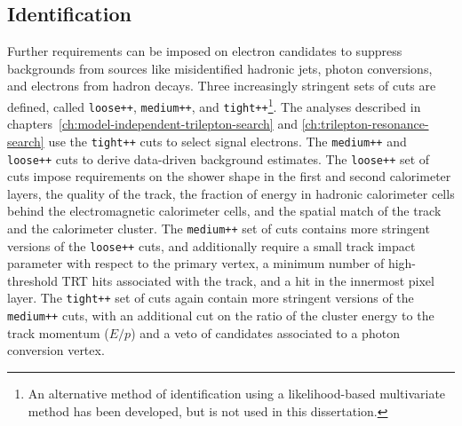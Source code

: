 \subsection{Identification}\label{sec:reco-electron-identification}
Further requirements can be imposed on electron candidates to suppress backgrounds from sources like misidentified hadronic jets, photon conversions, and electrons from hadron decays. Three increasingly stringent sets of cuts are defined, called \texttt{loose++}, \texttt{medium++}, and \texttt{tight++}\footnote{An alternative method of identification using a likelihood-based multivariate method has been developed, but is not used in this dissertation.}. The analyses described in chapters~\ref{ch:model-independent-trilepton-search} and \ref{ch:trilepton-resonance-search} use the \texttt{tight++} cuts to select signal electrons. The \texttt{medium++} and \texttt{loose++} cuts to derive data-driven background estimates. The \texttt{loose++} set of cuts impose requirements on the shower shape in the first and second calorimeter layers, the quality of the track, the fraction of energy in hadronic calorimeter cells behind the electromagnetic calorimeter cells, and the spatial match of the track and the calorimeter cluster. The \texttt{medium++} set of cuts contains more stringent versions of the \texttt{loose++} cuts, and additionally require a small track impact parameter with respect to the primary vertex, a minimum number of high-threshold TRT hits associated with the track, and a hit in the innermost pixel layer. The \texttt{tight++} set of cuts again contain more stringent versions of the \texttt{medium++} cuts, with an additional cut on the ratio of the cluster energy to the track momentum ($E/p$) and a veto of candidates associated to a photon conversion vertex. 


